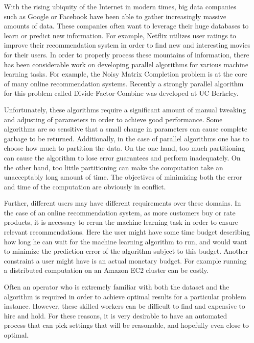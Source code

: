 With the rising ubiquity of the Internet in modern times, big data companies such as Google or Facebook have been able to gather increasingly massive amounts of data. These companies often want to leverage their huge databases to learn or predict new information. For example, Netflix utilizes user ratings to improve their recommendation system in order to find new and interesting movies for their users. In order to properly process these mountains of information, there has been considerable work on developing parallel algorithms for various machine learning tasks. For example, the Noisy Matrix Completion problem is at the core of many online recommendation systems. Recently a strongly parallel algorithm for this problem called Divide-Factor-Combine was developed at UC Berkeley\cite{MTJ13}. 

Unfortunately, these algorithms require a significant amount of manual tweaking and adjusting of parameters in order to achieve good performance. Some algorithms are so sensitive that a small change in parameters can cause complete garbage to be returned. Additionally, in the case of parallel algorithms one has to choose how much to partition the data. On the one hand, too much partitioning can cause the algorithm to lose error guarantees and perform inadequately. On the other hand, too little partitioning can make the computation take an unacceptably long amount of time. The objectives of minimizing both the error and time of the computation are obviously in conflict. 

Further, different users may have different requirements over these domains. In the case of an online recommendation system, as more customers buy or rate products, it is necessary to rerun the machine learning task in order to ensure relevant recommendations. Here the user might have some time budget describing how long he can wait for the machine learning algorithm to run, and would want to minimize the prediction error of the algorithm subject to this budget. Another constraint a user might have is an actual monetary budget. For example running a distributed computation on an Amazon EC2 cluster can be costly.

Often an operator who is extremely familiar with both the dataset and the algorithm is required in order to achieve optimal results for a particular problem instance. However, these skilled workers can be difficult to find and expensive to hire and hold. For these reasons, it is very desirable to have an automated process that can pick settings that will be reasonable, and hopefully even close to optimal. 


